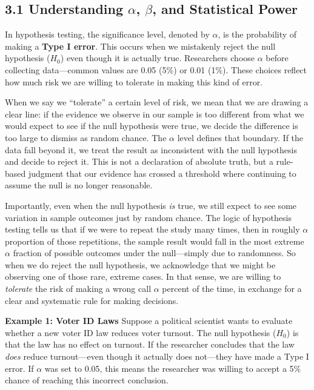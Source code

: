 \documentclass[12pt]{article}
\begin{document}
\subsection*{3.1 Understanding $\alpha$, $\beta$, and Statistical Power}

In hypothesis testing, the significance level, denoted by $\alpha$, is the probability of making a \textbf{Type I error}. This occurs when we mistakenly reject the null hypothesis ($H_0$) even though it is actually true. Researchers choose $\alpha$ before collecting data—common values are 0.05 (5\%) or 0.01 (1\%). These choices reflect how much risk we are willing to tolerate in making this kind of error.

When we say we ``tolerate'' a certain level of risk, we mean that we are drawing a clear line: if the evidence we observe in our sample is too different from what we would expect to see if the null hypothesis were true, we decide the difference is too large to dismiss as random chance. The $\alpha$ level defines that boundary. If the data fall beyond it, we treat the result as inconsistent with the null hypothesis and decide to reject it. This is not a declaration of absolute truth, but a rule-based judgment that our evidence has crossed a threshold where continuing to assume the null is no longer reasonable.

Importantly, even when the null hypothesis \textit{is} true, we still expect to see some variation in sample outcomes just by random chance. The logic of hypothesis testing tells us that if we were to repeat the study many times, then in roughly $\alpha$ proportion of those repetitions, the sample result would fall in the most extreme $\alpha$ fraction of possible outcomes under the null—simply due to randomness. So when we do reject the null hypothesis, we acknowledge that we might be observing one of those rare, extreme cases. In that sense, we are willing to \textit{tolerate} the risk of making a wrong call $\alpha$ percent of the time, in exchange for a clear and systematic rule for making decisions.

\textbf{Example 1: Voter ID Laws}
Suppose a political scientist wants to evaluate whether a new voter ID law reduces voter turnout. The null hypothesis ($H_0$) is that the law has no effect on turnout. If the researcher concludes that the law \textit{does} reduce turnout—even though it actually does not—they have made a Type I error. If $\alpha$ was set to 0.05, this means the researcher was willing to accept a 5\% chance of reaching this incorrect conclusion.
\end{document}
